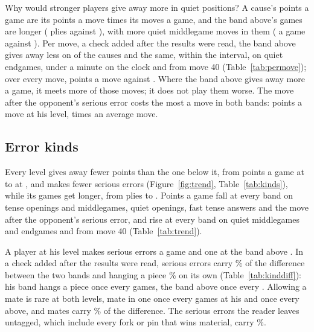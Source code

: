 \documentclass[11pt]{article}
\begin{document}
Why would stronger players give away more in quiet positions? A cause's points a game are its points
a move times its moves a game, and the band above's games are longer (\AbovePlies{} plies against
\HisPlies), with more quiet middlegame moves in them (\AboveQuietMiddlegameMoves{} a game against
\HisQuietMiddlegameMoves). Per move, a check added after the results were read, the band above gives
away less on \PerMoveLess{} of the \Causes{} causes and the same, within the interval, on quiet
endgames, under a minute on the clock and from move 40 (Table~\ref{tab:permove}); over every move,
\AllPerMoveAbove{} points a move against \AllPerMoveHis. Where the band above gives away more a game,
it meets more of those moves; it does not play them worse. The move after the opponent's serious
error costs the most a move in both bands: \GiftPerMoveHis{} points a move at his level, \GiftRatio{}
times an average move.

\begin{table}[h]
\centering
\scriptsize\PerMoveTable
\caption{Per game and per move (added after the results were read; it tests nothing): each cause's
moves a game, and the points a move given away on it, the band's total points over its total moves,
with the difference (above minus his).}
\label{tab:permove}
\end{table}

\subsection{Error kinds}

Every level gives away fewer points than the one below it, from \AllLow{} points a game at
\BandLo{} to \AllHigh{} at \BandHi, and makes fewer serious errors (Figure~\ref{fig:trend},
Table~\ref{tab:kinds}), while its games get longer, from \PliesLow{} plies to \PliesHigh. Points a
game fall at every band on tense openings and middlegames, quiet openings, fast tense answers and
the move after the opponent's serious error, and rise at every band on quiet middlegames and
endgames and from move 40 (Table~\ref{tab:trend}).

A player at his level makes \HisSerious{} serious errors a game and one at the band above
\AboveSerious. In a check added after the results were read, serious errors carry
\SeriousDiffShare\% of the difference between the two bands and hanging a piece \HangingDiffShare\%
on its own (Table~\ref{tab:kinddiff}): his band hangs a piece once every \HisHangingEvery{} games,
the band above once every \AboveHangingEvery. Allowing a mate is rare at both levels, mate in one
once every \HisMateOneEvery{} games at his and once every \AboveMateOneEvery{} above, and mates carry
\MatesDiffShare\% of the difference. The serious errors the reader leaves untagged, which include
every fork or pin that wins material, carry \UntaggedDiffShare\%.
\end{document}

